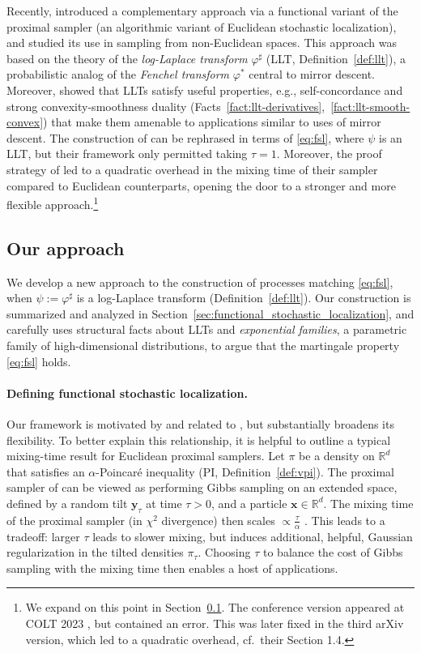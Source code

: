 \documentclass[11pt]{article}
\newcommand{\defeq}{:=}
\newcommand{\R}{\mathbb{R}}
\newcommand{\0}{\mathbf{0}}
\newcommand{\1}{\mathbf{1}}
\newcommand{\vx}{\mathbf{x}}
\newcommand{\vy}{\mathbf{y}}
\newcommand{\vhi}{\varphi}
\begin{document}
Recently, \cite{GopiLLST25} introduced a complementary approach via a functional variant of the proximal sampler (an algorithmic variant of Euclidean stochastic localization), and studied its use in sampling from non-Euclidean spaces. This approach was based on the theory of the \emph{log-Laplace transform} $\vhi^\sharp$ (LLT, Definition~\ref{def:llt}), a probabilistic analog of the \emph{Fenchel transform} $\vhi^*$ central to mirror descent. Moreover, \cite{GopiLLST25} showed that LLTs satisfy useful properties, e.g., self-concordance and strong convexity-smoothness duality (Facts~\ref{fact:llt-derivatives},~\ref{fact:llt-smooth-convex}) that make them amenable to applications similar to uses of mirror descent. 
The construction of \cite{GopiLLST25} can be rephrased in terms of \eqref{eq:fsl}, where $\psi$ is an LLT, but their framework only permitted taking $\tau = 1$. 
Moreover, the proof strategy of \cite{GopiLLST25} led to a quadratic overhead in the mixing time of their sampler compared to Euclidean counterparts, opening the door to a stronger and more flexible approach.\footnote{We expand on this point in Section~\ref{ssec:approach}. The conference version appeared at COLT 2023 \cite{GopiLLST23}, but contained an error. This was later fixed in the third arXiv version, which led to a quadratic overhead, cf.\ their Section 1.4.}


\subsection{Our approach}\label{ssec:approach}

We develop a new approach to the construction of processes matching \eqref{eq:fsl}, when $\psi \defeq \vhi^\sharp$ is a log-Laplace transform (Definition~\ref{def:llt}). Our construction is summarized and analyzed in Section~\ref{sec:functional_stochastic_localization}, and carefully uses structural facts about LLTs and \emph{exponential families}, a parametric family of high-dimensional distributions, to argue that the martingale property \eqref{eq:fsl} holds.


\paragraph{Defining functional stochastic localization.} Our framework is motivated by and related to \cite{GopiLLST25}, but substantially broadens its flexibility. To better explain this relationship, it is helpful to outline a typical mixing-time result for Euclidean proximal samplers. Let $\pi$ be a density on $\R^d$ that satisfies an $\alpha$-Poincar\'e inequality (PI, Definition~\ref{def:vpi}). The proximal sampler of \cite{LeeST21} can be viewed as performing Gibbs sampling on an extended space, defined by a random tilt $\vy_\tau$ at time $\tau > 0$, and a particle $\vx \in \R^d$. The mixing time of the proximal sampler (in $\chi^2$ divergence) then scales $\propto \frac \tau \alpha$ \cite{LeeST21, ChenCSW22, ChenE22}. This leads to a tradeoff: larger $\tau$ leads to slower mixing, but induces additional, helpful, Gaussian regularization in the tilted densities $\pi_\tau$. Choosing $\tau$ to balance the cost of Gibbs sampling with the mixing time then enables a host of applications.
\end{document}
